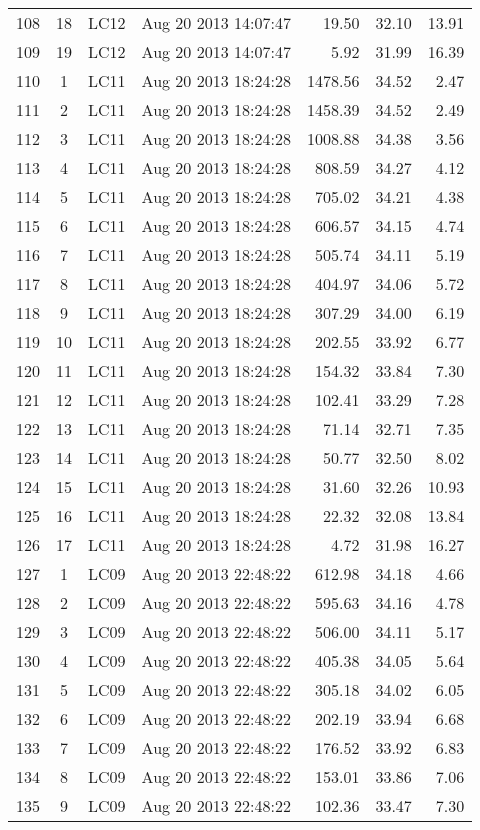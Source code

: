 \begin{longtable}{ccllrrr}
108&18&LC12&Aug 20 2013 14:07:47&19.50&32.10&13.91\\
109&19&LC12&Aug 20 2013 14:07:47&5.92&31.99&16.39\\
\hline 
110&1&LC11&Aug 20 2013 18:24:28&1478.56&34.52&2.47\\
111&2&LC11&Aug 20 2013 18:24:28&1458.39&34.52&2.49\\
112&3&LC11&Aug 20 2013 18:24:28&1008.88&34.38&3.56\\
113&4&LC11&Aug 20 2013 18:24:28&808.59&34.27&4.12\\
114&5&LC11&Aug 20 2013 18:24:28&705.02&34.21&4.38\\
115&6&LC11&Aug 20 2013 18:24:28&606.57&34.15&4.74\\
116&7&LC11&Aug 20 2013 18:24:28&505.74&34.11&5.19\\
117&8&LC11&Aug 20 2013 18:24:28&404.97&34.06&5.72\\
118&9&LC11&Aug 20 2013 18:24:28&307.29&34.00&6.19\\
119&10&LC11&Aug 20 2013 18:24:28&202.55&33.92&6.77\\
120&11&LC11&Aug 20 2013 18:24:28&154.32&33.84&7.30\\
121&12&LC11&Aug 20 2013 18:24:28&102.41&33.29&7.28\\
122&13&LC11&Aug 20 2013 18:24:28&71.14&32.71&7.35\\
123&14&LC11&Aug 20 2013 18:24:28&50.77&32.50&8.02\\
124&15&LC11&Aug 20 2013 18:24:28&31.60&32.26&10.93\\
125&16&LC11&Aug 20 2013 18:24:28&22.32&32.08&13.84\\
126&17&LC11&Aug 20 2013 18:24:28&4.72&31.98&16.27\\
\hline 
127&1&LC09&Aug 20 2013 22:48:22&612.98&34.18&4.66\\
128&2&LC09&Aug 20 2013 22:48:22&595.63&34.16&4.78\\
129&3&LC09&Aug 20 2013 22:48:22&506.00&34.11&5.17\\
130&4&LC09&Aug 20 2013 22:48:22&405.38&34.05&5.64\\
131&5&LC09&Aug 20 2013 22:48:22&305.18&34.02&6.05\\
132&6&LC09&Aug 20 2013 22:48:22&202.19&33.94&6.68\\
133&7&LC09&Aug 20 2013 22:48:22&176.52&33.92&6.83\\
134&8&LC09&Aug 20 2013 22:48:22&153.01&33.86&7.06\\
135&9&LC09&Aug 20 2013 22:48:22&102.36&33.47&7.30\\

\end{longtable}
